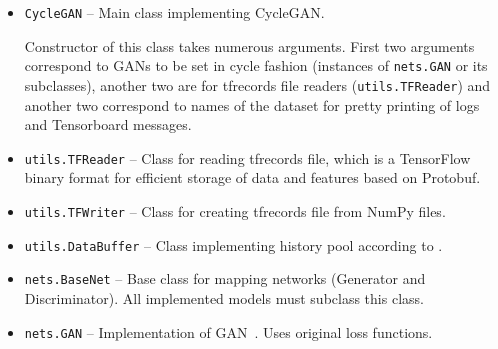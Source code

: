 \begin{itemize}
\item \texttt{CycleGAN} -- Main class implementing CycleGAN.
\begin{description}
 Constructor of this class takes numerous arguments. First two arguments correspond to GANs to be set in cycle fashion (instances of \texttt{nets.GAN} or its subclasses), another two are for tfrecords file readers (\texttt{utils.TFReader}) and another two correspond to names of the dataset for pretty printing of logs and Tensorboard messages.
\end{description}
\item \texttt{utils.TFReader} -- Class for reading tfrecords file, which is a TensorFlow binary format for efficient storage of data and features based on Protobuf.
\begin{description}
\end{description}
\item \texttt{utils.TFWriter} -- Class for creating tfrecords file from NumPy files.
\begin{description}
\end{description}
\item \texttt{utils.DataBuffer} -- Class implementing history pool according to \cite{historypool}.
\begin{description}
\end{description}
\item \texttt{nets.BaseNet} -- Base class for mapping networks (Generator and Discriminator). All implemented models must subclass this class.
\begin{description}
\end{description}
\item \texttt{nets.GAN} -- Implementation of GAN~\cite{origgan}. Uses original loss functions.
\begin{description}
\end{description}

\end{itemize}
